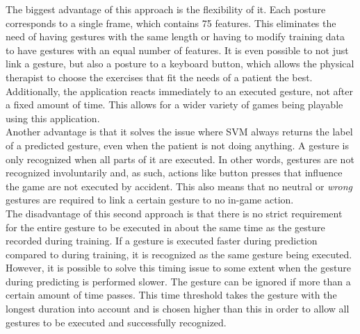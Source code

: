 The biggest advantage of this approach is the flexibility of it. Each posture corresponds to a single frame, which contains 75 features. This eliminates the need of having gestures with the same length or having to modify training data to have gestures with an equal number of features. It is even possible to not just link a gesture, but also a posture to a keyboard button, which allows the physical therapist to choose the exercises that fit the needs of a patient the best. Additionally, the application reacts immediately to an executed gesture, not after a fixed amount of time. This allows for a wider variety of games being playable using this application.\\

Another advantage is that it solves the issue where SVM always returns the label of a predicted gesture, even when the patient is not doing anything. A gesture is only recognized when all parts of it are executed. In other words, gestures are not recognized involuntarily and, as such, actions like button presses that influence the game are not executed by accident. This also means that no neutral or \emph{wrong} gestures are required to link a certain gesture to no in-game action.\\ %

The disadvantage of this second approach is that there is no strict requirement for the entire gesture to be executed in about the same time as the gesture recorded during training. If a gesture is executed faster during prediction compared to during training, it is recognized as the same gesture being executed. However, it is possible to solve this timing issue to some extent when the gesture during predicting is performed slower. The gesture can be ignored if more than a certain amount of time passes. This time threshold takes the gesture with the longest duration into account and is chosen higher than this in order to allow all gestures to be executed and successfully recognized.